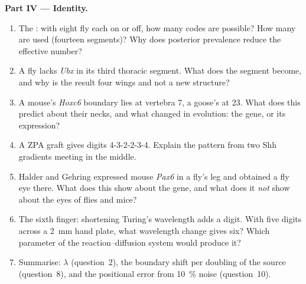 \begin{problem}
\medskip
\noindent\textbf{Part IV --- Identity.}
\begin{enumerate}[resume]
  \item The : with eight fly  each on or off, how many
        codes are possible? How many are used (fourteen segments)? Why
        does posterior prevalence reduce the effective number?
  \item A fly lacks \emph{Ubx} in its third thoracic segment. What does
        the segment become, and why is the result four wings and not a
        new structure?
  \item A mouse's \emph{Hoxc6} boundary lies at vertebra 7, a goose's at
        23. What does this predict about their necks, and what changed
        in evolution: the gene, or its expression?
  \item A ZPA graft gives digits 4-3-2-2-3-4. Explain the pattern from
        two Shh gradients meeting in the middle.
  \item Halder and Gehring expressed mouse \emph{Pax6} in a fly's leg
        and obtained a fly eye there. What does this show about the
        gene, and what does it \emph{not} show about the eyes of flies
        and mice?
  \item The sixth finger: shortening Turing's wavelength adds a digit.
        With five digits across a \qty{2}{mm} hand plate, what
        wavelength change gives six? Which parameter of the
        reaction--diffusion system would produce it?
  \item Summarise: $\lambda$ (question~2), the boundary shift per
        doubling of the source (question~8), and the positional error
        from \qty{10}{\%} noise (question~10).
\end{enumerate}
\end{problem}
